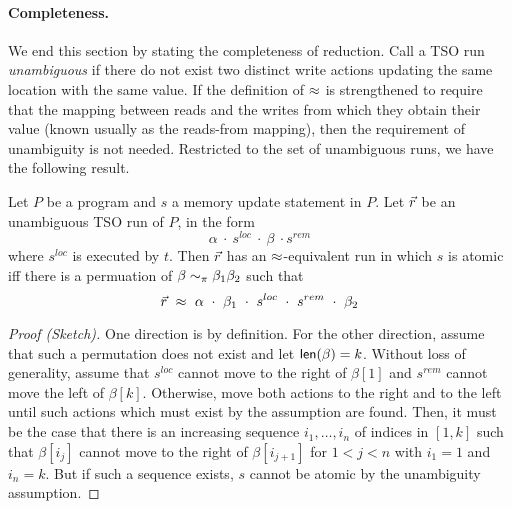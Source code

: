 \paragraph{Completeness.}
We end this section by stating the completeness of reduction.
Call a TSO run {\em unambiguous} if there do not exist two distinct write actions updating the same location with the same value.
If the definition of $\approx$ is strengthened to require that the mapping between reads and the writes from which they obtain their value (known usually as the reads-from mapping), then the requirement of unambiguity is not needed.
Restricted to the set of unambiguous runs, we have the following result.
\begin{theorem}\label{thm:completeness}
Let $P$ be a program and $s$ a memory update statement in $P$.
Let $\vec{r}$ be an unambiguous TSO run of $P$, in the form 
\[
\alpha\ \cdot\ s^{loc}\ \cdot\ \beta\ \cdot s^{rem}
\]
where $s^{loc}$ is executed by $t$.
Then $\vec{r}$ has an $\approx$-equivalent run in which $s$ is atomic iff there is a permuation of $\beta\sim_{\pi}\beta_1\beta_2$ such that 
\[
\alisequencex r\ \tsoequiv\ \alpha\ \cdot\ \beta_1\ \cdot\ s^{loc}\ \cdot\ s^{rem}\ \cdot\ \beta_2 
\]
\end{theorem}
\begin{proof}[Proof (Sketch)]
One direction is by definition.
For the other direction, assume that such a permutation does not exist and let $\mathsf{len}(\beta)=k$.
Without loss of generality, assume that $s^{loc}$ cannot move to the right of $\beta[1]$ and $s^{rem}$ cannot move the left of $\beta[k]$.
Otherwise, move both actions to the right and to the left until such actions which must exist by the assumption are found.
Then, it must be the case that there is an increasing sequence $i_1,\ldots,i_n$ of indices in $[1,k]$ such that $\beta[i_j]$ cannot move to the right of $\beta[i_{j+1}]$ for $1<j<n$ with $i_1=1$ and $i_n=k$.
But if such a sequence exists, $s$ cannot be atomic by the unambiguity assumption.
\end{proof}

%

